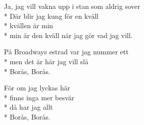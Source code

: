 \begin{SongText}
\begin{SongVerse}
\end{SongVerse}
\begin{SongVerse}
Ja, jag vill vakna upp i stan som aldrig sover\\*%
Där blir jag kung för en kväll\\*%
kvällen är min\\*%
min är den kväll när jag gör vad jag vill.
\end{SongVerse}
\begin{SongVerse}
På Broadways estrad var jag nummer ett\\*%
men det är här jag vill slå\\*%
Borås, Borås.
\end{SongVerse}
\begin{SongVerse}
För om jag lyckas här\\*%
finns inga mer besvär\\*%
då har jag allt\\*%
Borås, Borås. 
\end{SongVerse}
\end{SongText}
